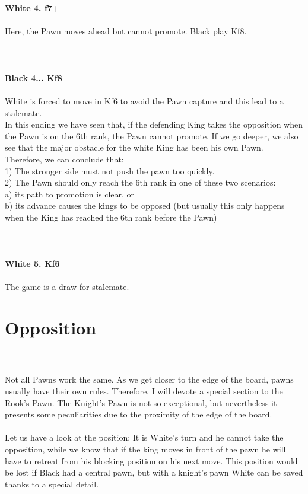 \documentclass{article}
\begin{document}
\\
\\
\textbf{White 4. f7+}\\
\\
Here, the Pawn moves ahead but cannot promote. Black play Kf8.\\
\\

\\
\\
\textbf{Black 4... Kf8}\\
\\
White is forced to move in Kf6 to avoid the Pawn capture and this lead to a stalemate.\\In this ending we have seen that, if the defending King takes the opposition when the Pawn is on the 6th rank, the Pawn cannot promote. If we go deeper, we also see that the major obstacle for the white King has been his own Pawn.\\Therefore, we can conclude that:\\1) The stronger side must not push the pawn too quickly.\\2) The Pawn should only reach the 6th rank in one of these two scenarios:\\a) its path to promotion is clear, or\\b) its advance causes the kings to be opposed (but usually this only happens when the King has reached the 6th rank before the Pawn)\\
\\

\\
\\
\textbf{White 5. Kf6}\\
\\
The game is a draw for stalemate.\section{ Opposition}

\\
\\
Not all Pawns work the same. As we get closer to the edge of the board, pawns usually have their own rules. Therefore, I will devote a special section to the Rook's Pawn. The Knight's Pawn is not so exceptional, but nevertheless it presents some peculiarities due to the proximity of the edge of the board.\\\\Let us have a look at the position: It is White's turn and he cannot take the opposition, while we know that if the king moves in front of the pawn he will have to retreat from his blocking position on his next move. This position would be lost if Black had a central pawn, but with a knight's pawn White can be saved thanks to a special detail.\\
\end{document}
